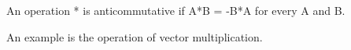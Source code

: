 An operation * is anticommutative if A*B = -B*A for every A and B.
\par
An example is the operation of vector multiplication.